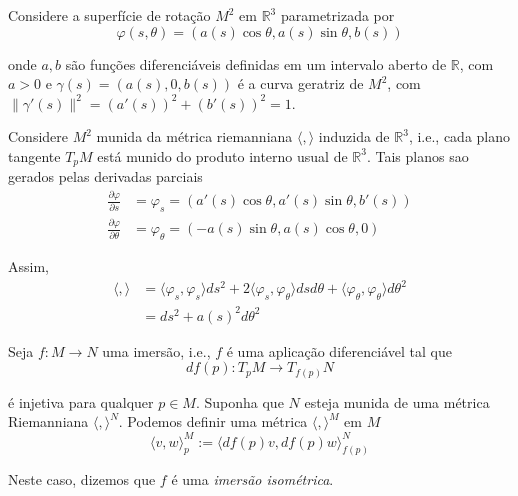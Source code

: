 \begin{exemplo}
	Considere a superfície de rotação $M^2$ em $\mathbb{R}^3$ parametrizada por
	\begin{equation*}
		\varphi(s,\theta) = (a(s) \cos \theta, a(s) \sin \theta, b(s))
	\end{equation*}
	
	onde $a,b$ são funções diferenciáveis definidas em um intervalo aberto de $\mathbb{R}$, com $a>0$ e $\gamma(s) = (a(s),0,b(s))$ é a curva geratriz de $M^2$, com $\| \gamma'(s) \|^2 = (a'(s))^2 + (b'(s))^2 = 1$.
	
	Considere $M^2$ munida da métrica riemanniana $\langle , \rangle$ induzida de $\mathbb{R}^3$, i.e., cada plano tangente $T_p M$ está munido do produto interno usual de $\mathbb{R}^3$. Tais planos sao gerados pelas derivadas parciais
	\begin{align*}
		\frac{\partial \varphi}{\partial s} &= \varphi_s = (a'(s) \cos \theta, a'(s) \sin \theta, b'(s))\\
		\frac{\partial \varphi}{\partial \theta} &= \varphi_{\theta} = (-a(s) \sin \theta, a(s) \cos \theta, 0)
	\end{align*}
	
	Assim,
	\begin{align*}
		\langle , \rangle &= \langle \varphi_s, \varphi_s \rangle ds^2 + 2 \langle \varphi_s, \varphi_{\theta} \rangle ds d\theta + \langle \varphi_{\theta}, \varphi_{\theta} \rangle d\theta^2\\
		&= ds^2 + a(s)^2 d\theta^2
	\end{align*}
\end{exemplo}

\begin{exemplo}
	Seja $f: M \rightarrow N$ uma imersão, i.e., $f$ é uma aplicação diferenciável tal que
	\begin{equation*}
		df(p): T_p M \rightarrow T_{f(p)} N
	\end{equation*}
	
	é injetiva para qualquer $p \in M$. Suponha que $N$ esteja munida de uma métrica Riemanniana $\langle , \rangle^N$. Podemos definir uma métrica $\langle , \rangle^M$ em $M$
	\begin{equation*}
		\langle v,w \rangle_p^M := \langle df(p) v, df(p) w \rangle_{f(p)}^N
	\end{equation*}
	
	Neste caso, dizemos que $f$ é uma \emph{imersão isométrica}.
\end{exemplo}